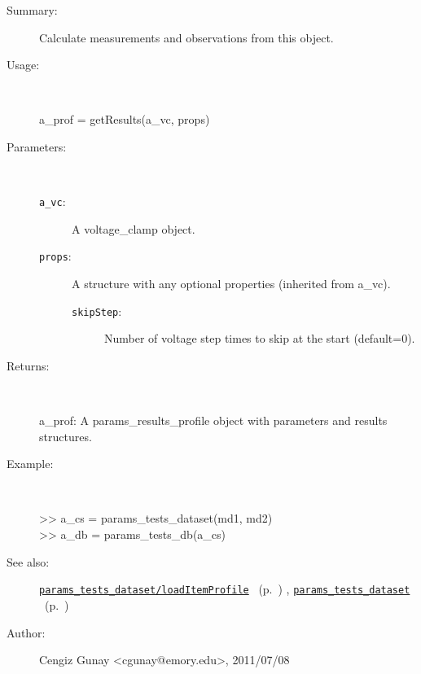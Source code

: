 \begin{description}
\item[Summary:]Calculate measurements and observations from this object.
%
\item[Usage:]~%
\begin{lyxcode}%
a\_prof = getResults(a\_vc, props)
%
\end{lyxcode}%
%
%
\item[Parameters:]~
\begin{description}%
\item[\texttt{a\_vc}:]
 A voltage\_clamp object.
\item[\texttt{props}:]
 A structure with any optional properties (inherited from a\_vc).
\begin{description}%
\item[\texttt{skipStep}:]
 Number of voltage step times to skip at the start (default=0).
\end{description}%
\end{description}%
%
\item[Returns:
]~

   a\_prof: A params\_results\_profile object with parameters and results structures.
%
\item[Example:]~
\begin{lyxcode} >> a\_cs = params\_tests\_dataset({md1, md2})
\\%
 >> a\_db = params\_tests\_db(a\_cs) %
\\%
\end{lyxcode}
%
\item[See also:]%
\hyperlink{ref_params_tests_dataset__loadItemProfile}{\texttt{params\_tests\_dataset/loadItemProfile}}%
\ (p.~\pageref{ref_params_tests_dataset__loadItemProfile})%
%
, \hyperlink{ref_params_tests_dataset}{\texttt{params\_tests\_dataset}}%
\ (p.~\pageref{ref_params_tests_dataset})%
%
%
\item[Author:]%
Cengiz Gunay <cgunay@emory.edu>, 2011/07/08
%
\end{description}
\methodline%
